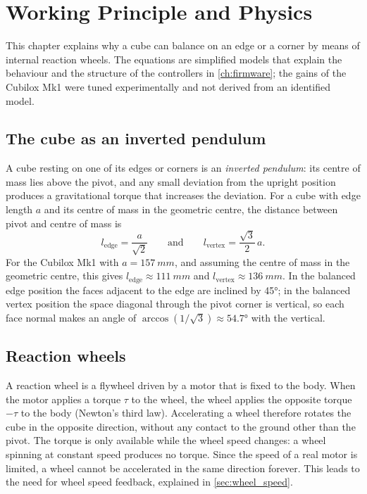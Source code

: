 \chapter{Working Principle and Physics}
\label{ch:principle}

This chapter explains why a cube can balance on an edge or a corner by means of internal reaction
wheels. The equations are simplified models that explain the behaviour and the structure of the
controllers in \cref{ch:firmware}; the gains of the Cubilox Mk1 were tuned experimentally and not
derived from an identified model.

\section{The cube as an inverted pendulum}

A cube resting on one of its edges or corners is an \emph{inverted pendulum}: its centre of mass
lies above the pivot, and any small deviation from the upright position produces a gravitational
torque that increases the deviation. For a cube with edge length $a$ and its centre of mass in the
geometric centre, the distance between pivot and centre of mass is
\begin{equation}
  l_\text{edge} = \frac{a}{\sqrt{2}} \qquad\text{and}\qquad l_\text{vertex} = \frac{\sqrt{3}}{2}\,a .
\end{equation}
For the Cubilox Mk1 with $a = \SI{157}{mm}$, and assuming the centre of mass in the geometric
centre, this gives $l_\text{edge} \approx \SI{111}{mm}$ and $l_\text{vertex} \approx \SI{136}{mm}$.
In the balanced edge position the faces adjacent to the edge are inclined by \ang{45}; in the
balanced vertex position the space diagonal through the pivot corner is vertical, so each face
normal makes an angle of $\arccos(1/\sqrt{3}) \approx \ang{54.7}$ with the vertical.

\section{Reaction wheels}

A reaction wheel is a flywheel driven by a motor that is fixed to the body. When the motor applies
a torque $\tau$ to the wheel, the wheel applies the opposite torque $-\tau$ to the body
(Newton's third law). Accelerating a wheel therefore rotates the cube in the opposite direction,
without any contact to the ground other than the pivot. The torque is only available while the
wheel speed changes: a wheel spinning at constant speed produces no torque. Since the speed of a
real motor is limited, a wheel cannot be accelerated in the same direction forever. This leads to
the need for wheel speed feedback, explained in \cref{sec:wheel_speed}.

